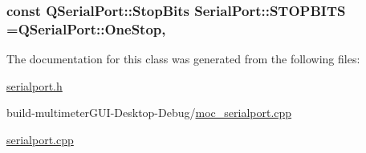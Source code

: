 \hypertarget{class_serial_port_a52f45df73cda27a0c096ddbfa53ff025}{
\subsubsection[{S\-T\-O\-P\-B\-I\-T\-S}]{\setlength{\rightskip}{0pt plus 5cm}const Q\-Serial\-Port\-::\-Stop\-Bits Serial\-Port\-::\-S\-T\-O\-P\-B\-I\-T\-S =Q\-Serial\-Port\-::\-One\-Stop\hspace{0.3cm}{\ttfamily [static]}, {\ttfamily [private]}}}\label{class_serial_port_a52f45df73cda27a0c096ddbfa53ff025}


The documentation for this class was generated from the following files\-:\begin{DoxyCompactItemize}
\item 
\hyperlink{serialport_8h}{serialport.\-h}\item 
build-\/multimeter\-G\-U\-I-\/\-Desktop-\/\-Debug/\hyperlink{moc__serialport_8cpp}{moc\-\_\-serialport.\-cpp}\item 
\hyperlink{serialport_8cpp}{serialport.\-cpp}\end{DoxyCompactItemize}
